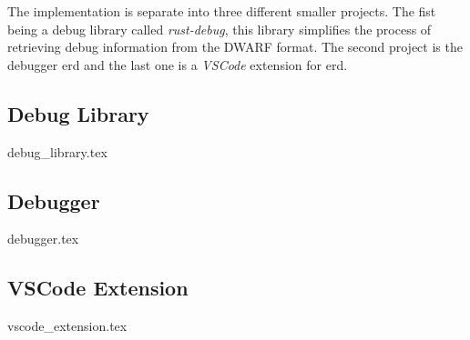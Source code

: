  

The implementation is separate into three different smaller projects.
The fist being a debug library called \emph{rust-debug}, this library simplifies the process of retrieving debug information from the \gls{DWARF} format.
The second project is the debugger \gls{erd} and the last one is a \emph{VSCode} extension for \gls{erd}.


\subsection{Debug Library}
\label{subsection:rust-debug}
{debug_library.tex}


\subsection{Debugger}
{debugger.tex}


\subsection{VSCode Extension}
{vscode_extension.tex}

